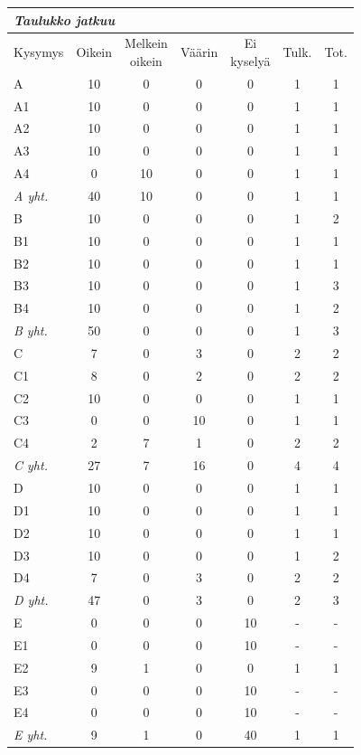 \begin{longtable}{lcccccc}
  \multicolumn{7}{l}{\small\textit{Taulukko \thetable{} jatkuu}} \\
  \toprule
  Kysymys & Oikein & \makecell{Melkein\\oikein} & Väärin &
  \makecell{Ei\\kyselyä} & Tulk. & Tot. \\
  \midrule
  \endhead
  \bottomrule
  \endlastfoot
  A    & 10 & 0  & 0 & 0 & 1 & 1 \\
  A1   & 10 & 0  & 0 & 0 & 1 & 1 \\
  A2   & 10 & 0  & 0 & 0 & 1 & 1 \\
  A3   & 10 & 0  & 0 & 0 & 1 & 1 \\
  A4   & 0  & 10 & 0 & 0 & 1 & 1 \\
  \cmidrule(l){2-7}
  \textit{A yht.} & 40 & 10 & 0 & 0
  & 1 & 1 \\
  \midrule
  B    & 10 & 0 & 0 & 0 & 1 & 2 \\
  B1   & 10 & 0 & 0 & 0 & 1 & 1 \\
  B2   & 10 & 0 & 0 & 0 & 1 & 1 \\
  B3   & 10 & 0 & 0 & 0 & 1 & 3 \\
  B4   & 10 & 0 & 0 & 0 & 1 & 2 \\
  \cmidrule(l){2-7}
  \textit{B yht.} & 50 & 0 & 0 & 0
  & 1 & 3 \\
  \midrule
  C    & 7  & 0 & 3  & 0 & 2 & 2 \\
  C1   & 8  & 0 & 2  & 0 & 2 & 2 \\
  C2   & 10 & 0 & 0  & 0 & 1 & 1 \\
  C3   & 0  & 0 & 10 & 0 & 1 & 1 \\
  C4   & 2  & 7 & 1  & 0 & 2 & 2 \\
  \cmidrule(l){2-7}
  \textit{C yht.} &  27  & 7  &  16  & 0 & 4 & 4 \\
  \midrule
  D    & 10 & 0 & 0 & 0 & 1 & 1 \\
  D1   & 10 & 0 & 0 & 0 & 1 & 1 \\
  D2   & 10 & 0 & 0 & 0 & 1 & 1 \\
  D3   & 10 & 0 & 0 & 0 & 1 & 2 \\
  D4   & 7  & 0 & 3 & 0 & 2 & 2 \\
  \cmidrule(l){2-7}
  \textit{D yht.} &  47 & 0 & 3 & 0 & 2 & 3 \\
  \midrule
  E    & 0 & 0 & 0 & 10 & - & - \\
  E1   & 0 & 0 & 0 & 10 & - & - \\
  E2   & 9 & 1 & 0 & 0  & 1  & 1 \\
  E3   & 0 & 0 & 0 & 10 & - & - \\
  E4   & 0 & 0 & 0 & 10 & - & - \\
  \cmidrule(l){2-7}
  \textit{E yht.} & 9 & 1 & 0 & 40 & 1  & 1 \\
\end{longtable}

